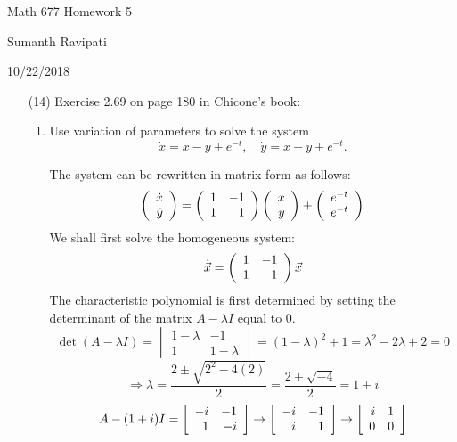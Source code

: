 \documentclass[12pt,letterpaper,reqno]{amsart}
\begin{document}
\thispagestyle{empty}
\centerline{\Large Math 677 Homework 5}
\centerline{Sumanth Ravipati}
\centerline{10/22/2018}
\vspace{.25in}

\begin{enumerate}
\item[(14)] Exercise 2.69 on page 180 in Chicone's book: \newline

\begin{enumerate}
    \item Use variation of parameters to solve the system
    $$\dot{x} = x -y + e^{-t}, \quad \dot{y} = x + y + e^{-t}.$$
    \begin{flushleft}
    The system can be rewritten in matrix form as follows: $$\left( \begin{array} { r } { \dot{x} } \\ { \dot{y} } \end{array} \right) = \left( \begin{array} { r r } { 1 } & { - 1 } \\ { 1 } & { 1 } \end{array} \right)\left( \begin{array} { r } { x } \\ { y } \end{array} \right) + \left( \begin{array} { r } { e^{-t} } \\ { e^{-t} } \end{array} \right)$$
    We shall first solve the homogeneous system:
    $$\dot{\vec{x}} = \left( \begin{array} { r r } { 1 } & { - 1 } \\ { 1 } & { 1 } \end{array} \right)\vec{x}$$
    The characteristic polynomial is first determined by setting the determinant of the matrix $A - \lambda I$ equal to 0.
    $$\det(A-\lambda I) = \begin{vmatrix} { 1 - \lambda } & { -1 } \\ { 1 } & { 1 - \lambda }\end{vmatrix} = (1 - \lambda)^2 + 1 = \lambda^2 - 2\lambda + 2 = 0$$
    $$\Rightarrow \lambda = \frac{2 \pm \sqrt{2^2 - 4(2)}}{2} = \frac{2 \pm \sqrt{-4}}{2} = 1 \pm i$$
    $$A-(1+i)I = \left[ \begin{array} { r r } { -i } & { -1 } \\ { 1 } & { -i } \end{array} \right] \rightarrow \left[ \begin{array} { r r } { -i } & { -1 } \\ { i } & { 1 } \end{array} \right] \rightarrow \left[ \begin{array} { r r } { i } & { 1 } \\ { 0 } & { 0 } \end{array} \right]$$

\end{flushleft}
\end{enumerate}
\end{enumerate}
\end{document}
